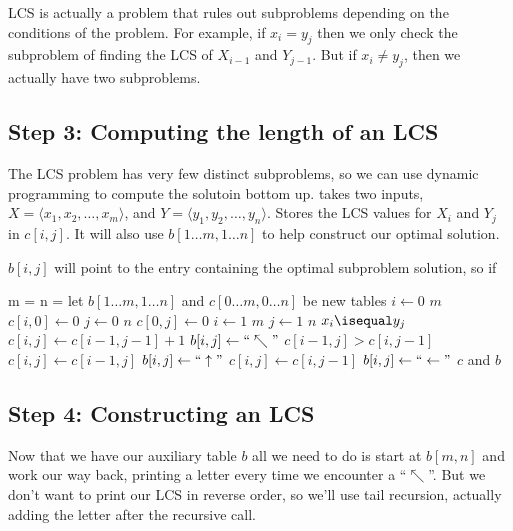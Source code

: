 \documentclass[11pt]{article}
\theoremstyle{definition}
\begin{document}
LCS is actually a problem that rules out subproblems depending on the conditions of the problem.  
For example, if \(x_i = y_j\) then we only check the subproblem of finding the LCS of  \(X_{i-1}\) 
and \(Y_{j-1}\).  But if \(x_i \neq y_j\), then we actually have two subproblems.
\newpage

\subsection*{Step 3: Computing the length of an LCS}
The LCS problem has very few distinct subproblems, so we can use dynamic programming to compute 
the solutoin bottom up.  takes two inputs, \(X = \langle x_1,x_2,\dots,x_m \rangle\), 
and \(Y = \langle y_1,y_2,\dots,y_n \rangle\).  Stores the LCS values for \(X_i\) and \(Y_j\) in 
\(c[i,j]\).  It will also use \(b[1 \dots m, 1 \dots n]\) to help construct our optimal solution.

\(b[i,j]\) will point to the entry containing the optimal subproblem solution, so if 

\begin{codebox}
  \li m = 
  \li n = 
  \li let \(b[1 \dots m, 1 \dots n]\) and \(c[0 \dots m, 0 \dots n]\) be new tables
  \li \For \(i \gets 0\) \To \(m\) \Do
    \li \(c[i,0] \gets 0\) \End
  \li \For \(j \gets 0\) \To \(n\) \Do
    \li \(c[0,j] \gets 0\) \End
  \li \For \(i \gets 1\) \To \(m\) \Do
    \li \For \(j \gets 1\) \To \(n\) \Do
      \li \If \(x_i \isequal y_j\) \Then 
        \li \(c[i,j] \gets c[i-1,j-1] + 1\)
        \li \(b[i,j] \gets ``\nwarrow"\)
      \li \ElseIf \(c[i-1,j] > c[i,j-1]\) \Then 
        \li \(c[i,j] \gets c[i-1,j]\)
        \li \(b[i,j] \gets ``\uparrow"\)
      \li \Else \(c[i,j] \gets c[i,j-1]\)
        \li \(b[i,j] \gets ``\leftarrow"\)
        \End \End \End 
  \li \Return \(c\) and \(b\)
\end{codebox}

\subsection*{Step 4: Constructing an LCS}
Now that we have our auxiliary table \(b\) all we need to do is start at \(b[m,n]\) and work 
our way back, printing a letter every time we encounter a ``\(\nwarrow\)''.  But we don't want to 
print our LCS in reverse order, so we'll use tail recursion, actually adding the letter after 
the recursive call.
\end{document}
